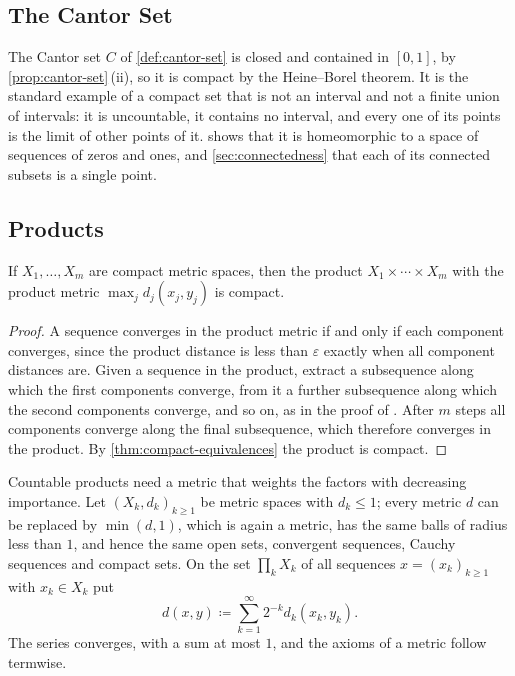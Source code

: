 \subsection{The Cantor Set}

The Cantor set $C$ of \cref{def:cantor-set} is closed and contained in $[0,1]$, by \cref{prop:cantor-set}\,(ii), so it is compact by the Heine--Borel theorem. It is the standard example of a compact set that is not an interval and not a finite union of intervals: it is uncountable, it contains no interval, and every one of its points is the limit of other points of it.  shows that it is homeomorphic to a space of sequences of zeros and ones, and \cref{sec:connectedness} that each of its connected subsets is a single point.

\subsection{Products}

\begin{proposition}
\label{prop:finite-product-compact}
If $X_1,\ldots,X_m$ are compact metric spaces, then the product $X_1\times\cdots\times X_m$ with the product metric $\max_jd_j(x_j,y_j)$ is compact.
\end{proposition}

\begin{proof}
A sequence converges in the product metric if and only if each component converges, since the product distance is less than $\varepsilon$ exactly when all component distances are. Given a sequence in the product, extract a subsequence along which the first components converge, from it a further subsequence along which the second components converge, and so on, as in the proof of . After $m$ steps all components converge along the final subsequence, which therefore converges in the product. By \cref{thm:compact-equivalences} the product is compact.
\end{proof}

Countable products need a metric that weights the factors with decreasing importance. Let $(X_k,d_k)_{k\ge1}$ be metric spaces with $d_k\le1$; every metric $d$ can be replaced by $\min(d,1)$, which is again a metric, has the same balls of radius less than $1$, and hence the same open sets, convergent sequences, Cauchy sequences and compact sets. On the set $\prod_kX_k$ of all sequences $x=(x_k)_{k\ge1}$ with $x_k\in X_k$ put
\begin{equation}
d(x,y)\coloneqq\sum_{k=1}^\infty2^{-k}d_k(x_k,y_k) .
\label{eq:product-metric-countable}
\end{equation}
The series converges, with a sum at most $1$, and the axioms of a metric follow termwise.

